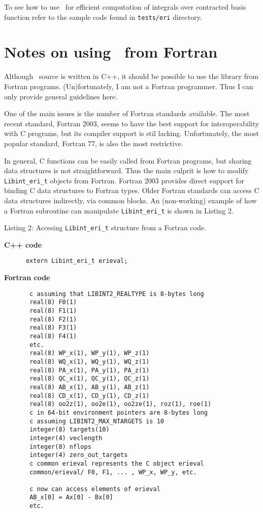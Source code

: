 \documentclass[12pt]{article}
\begin{document}
To see how to use \LIBINT\ for efficient computation of integrals over
contracted basis function refer to the sample code found in
{\tt tests/eri} directory.

\section{\label{sec:fort} Notes on using \LIBINT\ from Fortran}

Although \LIBINT\ source is written in C++, it should be possible to use the library
from Fortran programs. (Un)fortunately, I am not a Fortran programmer. Thus I can
only provide general guidelines here.

One of the main issues is the number of Fortran standards available. The most recent standard, Fortran 2003,
seems to have the best support for interoperability with C programs, but its compiler support is stil lacking.
Unfortunately, the most popular standard, Fortran 77, is also the most restrictive.

In general, C functions can be easily called from Fortran programs, but sharing data structures
is not straightforward. Thus the main culprit is how to modify  {\tt Libint\_eri\_t} objects
from Fortran. Fortran 2003 provides direct support for binding C data structures to
Fortran types. Older Fortran standards can access C data structures indirectly, via
common blocks. An (non-working) example of how a Fortran subroutine can manipulate {\tt Libint\_eri\_t}
is shown in Listing 2.

\begin{footnotesize}
Listing 2: Accesing {\tt Libint\_eri\_t} structure from a Fortran code.

{\bf C++ code}
\begin{verbatim}
      extern Libint_eri_t erieval;
\end{verbatim}

{\bf Fortran code}
\begin{verbatim}
       c assuming that LIBINT2_REALTYPE is 8-bytes long
       real(8) F0(1)
       real(8) F1(1)
       real(8) F2(1)
       real(8) F3(1)
       real(8) F4(1)
       etc.
       real(8) WP_x(1), WP_y(1), WP_z(1)
       real(8) WQ_x(1), WQ_y(1), WQ_z(1)
       real(8) PA_x(1), PA_y(1), PA_z(1)
       real(8) QC_x(1), QC_y(1), QC_z(1)
       real(8) AB_x(1), AB_y(1), AB_z(1)
       real(8) CD_x(1), CD_y(1), CD_z(1)
       real(8) oo2z(1), oo2e(1), oo2ze(1), roz(1), roe(1)
       c in 64-bit environment pointers are 8-bytes long
       c assuming LIBINT2_MAX_NTARGETS is 10
       integer(8) targets(10)
       integer(4) veclength
       integer(8) nflops
       integer(4) zero_out_targets
       c common erieval represents the C object erieval
       common/erieval/ F0, F1, ... , WP_x, WP_y, etc.

       c now can access elements of erieval
       AB_x[0] = Ax[0] - Bx[0]
       etc.
\end{verbatim}
\end{footnotesize}
\end{document}
